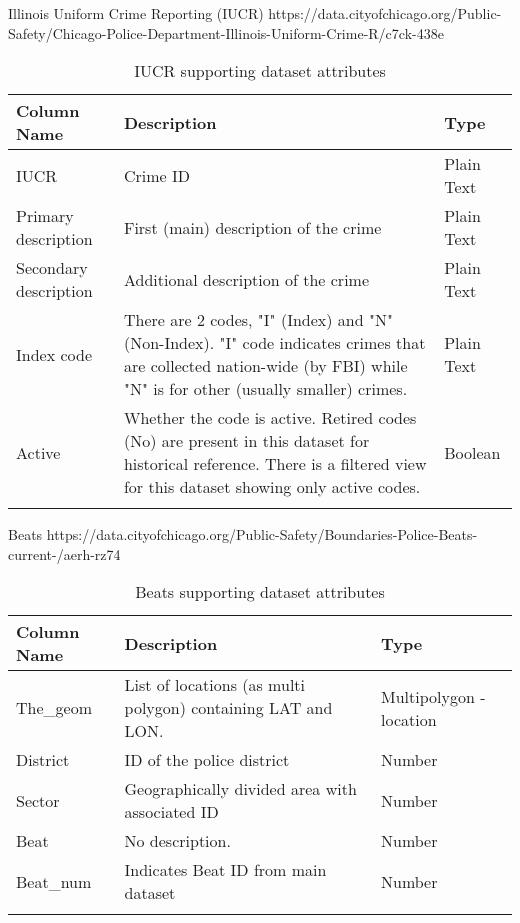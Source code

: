 Illinois Uniform Crime Reporting (IUCR) \newline
https://data.cityofchicago.org/Public-Safety/Chicago-Police-Department-Illinois-Uniform-Crime-R/c7ck-438e
\begin{center}
\begin{longtable}{|m{6em}|m{18em}|m{7em}|}
    \hline
    Column Name & 
    Description & 
    Type\\
    \hline
    IUCR & 
    Crime ID & 
    Plain Text\\
    \hline
    Primary description & 
    First (main) description of the crime & 
    Plain Text\\
    \hline
    Secondary description & 
    Additional description of the crime & 
    Plain Text\\
    \hline
    Index code & 
    There are 2 codes, "I" (Index) and "N" (Non-Index). "I" code indicates crimes that are collected nation-wide (by FBI) while "N" is for other (usually smaller) crimes. & 
    Plain Text\\
    \hline
    Active & 
    Whether the code is active. Retired codes (No) are present in this dataset for historical reference. There is a filtered view for this dataset showing only active codes. & 
    Boolean\\
    \hline
\caption{IUCR supporting dataset attributes}
\end{longtable}
\end{center}

Beats \newline
https://data.cityofchicago.org/Public-Safety/Boundaries-Police-Beats-current-/aerh-rz74
\begin{center}
\begin{longtable}{|m{6em}|m{18em}|m{7em}|}
    \hline
    Column Name & 
    Description & 
    Type\\
    \hline
    The\_geom & 
    List of locations (as multi polygon) containing LAT and LON. & 
    Multipolygon - location\\
    \hline
    District & 
    ID of the police district & 
    Number\\
    \hline
    Sector & 
    Geographically divided area with associated ID & 
    Number\\
    \hline
    Beat & 
    No description. & 
    Number\\
    \hline
    Beat\_num & 
    Indicates Beat ID from main dataset &
    Number\\
    \hline
\caption{Beats supporting dataset attributes}
\end{longtable}
\end{center}

